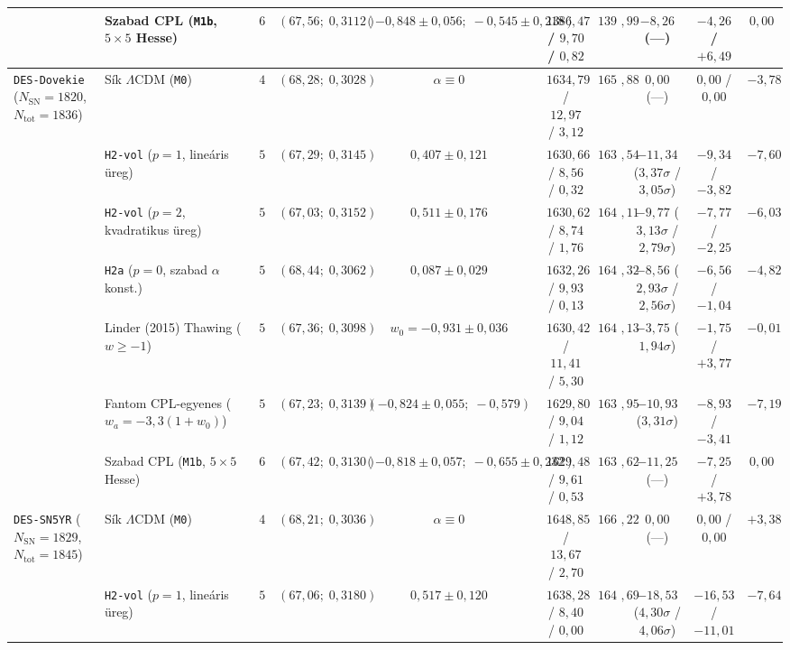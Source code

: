 \documentclass[11pt,a4paper]{article}
\begin{document}
\begin{table}[ht!]
{\begin{tabular}{llcccccccc}
 & Szabad CPL (\texttt{M1b}, $5\times 5$ Hesse) & $6$ & $(67{,}56;\;0{,}3112)$ & $(-0{,}848\pm 0{,}056;\;-0{,}545\pm 0{,}218)$ & $1386{,}47$ / $9{,}70$ / $0{,}82$ & $1396{,}99$ & $-8{,}26$ (---) & $-4{,}26$ / $+6{,}49$ & $0{,}00$ \\
\midrule
\texttt{DES-Dovekie} ($N_{\mathrm{SN}}=1820$, $N_{\mathrm{tot}}=1836$) & S\'ik $\Lambda$CDM (\texttt{M0}) & $4$ & $(68{,}28;\;0{,}3028)$ & $\alpha \equiv 0$ & $1634{,}79$ / $12{,}97$ / $3{,}12$ & $1650{,}88$ & $0{,}00$ (---) & $0{,}00$ / $0{,}00$ & $-3{,}78$ \\
 & \texttt{H2-vol} ($p=1$, line\'aris \"ureg) & $5$ & $(67{,}29;\;0{,}3145)$ & $0{,}407 \pm 0{,}121$ & $1630{,}66$ / $8{,}56$ / $0{,}32$ & $1639{,}54$ & $-11{,}34$ ($3{,}37\sigma$ / $3{,}05\sigma$) & $-9{,}34$ / $-3{,}82$ & $-7{,}60$ \\
 & \texttt{H2-vol} ($p=2$, kvadratikus \"ureg) & $5$ & $(67{,}03;\;0{,}3152)$ & $0{,}511 \pm 0{,}176$ & $1630{,}62$ / $8{,}74$ / $1{,}76$ & $1641{,}11$ & $-9{,}77$ ($3{,}13\sigma$ / $2{,}79\sigma$) & $-7{,}77$ / $-2{,}25$ & $-6{,}03$ \\
 & \texttt{H2a} ($p=0$, szabad $\alpha$ konst.) & $5$ & $(68{,}44;\;0{,}3062)$ & $0{,}087 \pm 0{,}029$ & $1632{,}26$ / $9{,}93$ / $0{,}13$ & $1642{,}32$ & $-8{,}56$ ($2{,}93\sigma$ / $2{,}56\sigma$) & $-6{,}56$ / $-1{,}04$ & $-4{,}82$ \\
 & Linder (2015) Thawing ($w \ge -1$) & $5$ & $(67{,}36;\;0{,}3098)$ & $w_0 = -0{,}931 \pm 0{,}036$ & $1630{,}42$ / $11{,}41$ / $5{,}30$ & $1647{,}13$ & $-3{,}75$ ($1{,}94\sigma$) & $-1{,}75$ / $+3{,}77$ & $-0{,}01$ \\
 & Fantom CPL-egyenes ($w_a=-3{,}3(1+w_0)$) & $5$ & $(67{,}23;\;0{,}3139)$ & $(-0{,}824 \pm 0{,}055;\;-0{,}579)$ & $1629{,}80$ / $9{,}04$ / $1{,}12$ & $1639{,}95$ & $-10{,}93$ ($3{,}31\sigma$) & $-8{,}93$ / $-3{,}41$ & $-7{,}19$ \\
 & Szabad CPL (\texttt{M1b}, $5\times 5$ Hesse) & $6$ & $(67{,}42;\;0{,}3130)$ & $(-0{,}818\pm 0{,}057;\;-0{,}655\pm 0{,}232)$ & $1629{,}48$ / $9{,}61$ / $0{,}53$ & $1639{,}62$ & $-11{,}25$ (---) & $-7{,}25$ / $+3{,}78$ & $0{,}00$ \\
\midrule
\texttt{DES-SN5YR} ($N_{\mathrm{SN}}=1829$, $N_{\mathrm{tot}}=1845$) & S\'ik $\Lambda$CDM (\texttt{M0}) & $4$ & $(68{,}21;\;0{,}3036)$ & $\alpha \equiv 0$ & $1648{,}85$ / $13{,}67$ / $2{,}70$ & $1665{,}22$ & $0{,}00$ (---) & $0{,}00$ / $0{,}00$ & $+3{,}38$ \\
 & \texttt{H2-vol} ($p=1$, line\'aris \"ureg) & $5$ & $(67{,}06;\;0{,}3180)$ & $0{,}517 \pm 0{,}120$ & $1638{,}28$ / $8{,}40$ / $0{,}00$ & $1646{,}69$ & $-18{,}53$ ($4{,}30\sigma$ / $4{,}06\sigma$) & $-16{,}53$ / $-11{,}01$ & $-7{,}64$ \\

\end{tabular}}
\end{table}
\end{document}
